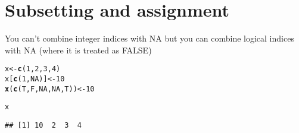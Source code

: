 \documentclass{article}\usepackage[]{graphicx}\usepackage[]{color}
\makeatletter
\newcommand{\hlnum}[1]{\textcolor[rgb]{0.686,0.059,0.569}{#1}}%
\newcommand{\hlstd}[1]{\textcolor[rgb]{0.345,0.345,0.345}{#1}}%
\newcommand{\hlkwb}[1]{\textcolor[rgb]{0.69,0.353,0.396}{#1}}%
\newcommand{\hlkwd}[1]{\textcolor[rgb]{0.737,0.353,0.396}{\textbf{#1}}}%
\newenvironment{kframe}{%
 \def\at@end@of@kframe{}%
 \ifinner\ifhmode%
  \def\at@end@of@kframe{\end{minipage}}%
  \begin{minipage}{\columnwidth}%
 \fi\fi%
 \def\FrameCommand##1{\hskip\@totalleftmargin \hskip-\fboxsep
 \colorbox{shadecolor}{##1}\hskip-\fboxsep
     \hskip-\linewidth \hskip-\@totalleftmargin \hskip\columnwidth}%
 \MakeFramed {\advance\hsize-\width
   \@totalleftmargin\z@ \linewidth\hsize
   \@setminipage}}%
 {\par\unskip\endMakeFramed%
 \at@end@of@kframe}
\newenvironment{knitrout}{}{} %
\makeatother
\begin{document}
\section{Subsetting and assignment}

You can't combine integer indices with NA but you can combine logical indices with NA (where it is treated as FALSE)

\begin{knitrout}
\color{fgcolor}\begin{kframe}
\begin{alltt}
\hlstd{x} \hlkwb{<-} \hlkwd{c}\hlstd{(}\hlnum{1}\hlstd{,} \hlnum{2}\hlstd{,} \hlnum{3}\hlstd{,} \hlnum{4}\hlstd{)}
\hlstd{x[}\hlkwd{c}\hlstd{(}\hlnum{1}\hlstd{,} \hlnum{NA}\hlstd{)]} \hlkwb{<-} \hlnum{10}
\hlkwd{x}\hlstd{(}\hlkwd{c}\hlstd{(T, F,} \hlnum{NA}\hlstd{,} \hlnum{NA}\hlstd{, T))} \hlkwb{<-} \hlnum{10}
\end{alltt}


{\ttfamily\noindent\bfseries{}}\begin{alltt}
\hlstd{x}
\end{alltt}
\begin{verbatim}
## [1] 10  2  3  4
\end{verbatim}
\end{kframe}
\end{knitrout}
\end{document}
